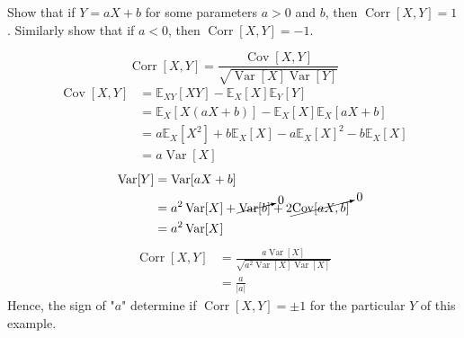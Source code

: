 \begin{example}
	Show that if $Y=aX+b$ for some parameters $a>0$ and $b$, then $\operatorname{Corr}[X,Y]=1$. Similarly show that if $a<0$, then $\operatorname{Corr}[X,Y]=-1$.
	
	\begin{equation}
		\operatorname{Corr}[X,Y] = \frac{\operatorname{Cov}[X,Y]}{\sqrt{\operatorname{Var}[X]\operatorname{Var}[Y]}}
	\end{equation}
	\begin{equation}
		\begin{split}
			\operatorname{Cov}[X,Y] & = \mathbb{E}_{XY}[XY]-\mathbb{E}_X[X]\mathbb{E}_Y[Y]\\
			&= \mathbb{E}_X[X(aX+b)]-\mathbb{E}_X[X]\mathbb{E}_X[aX+b]\\
			&= a\mathbb{E}_X[X^2]+b\mathbb{E}_X[X]-a\mathbb{E}_X[X]^2-b\mathbb{E}_X[X]\\
			&=a\operatorname{Var}[X]
		\end{split}
	\end{equation}
	\begin{equation}
		\begin{split}
			\operatorname{Var}[Y] &= \operatorname{Var}[aX+b]\\
			&= a^2\operatorname{Var}[X]+\cancelto{0}{\operatorname{Var}[b]}+2\cancelto{0}{\operatorname{Cov}[aX,b]}\\
			& = a^2\operatorname{Var}[X]
		\end{split}
	\end{equation}
	\begin{equation}
		\begin{split}
			\operatorname{Corr}[X,Y] &= \frac{a\operatorname{Var}[X]}{\sqrt{a^2\operatorname{Var}[X]\operatorname{Var}[X]}}\\
			&=\frac{a}{|a|}		
		\end{split}
	\end{equation}
	Hence, the sign of "$a$" determine if $\operatorname{Corr}[X,Y]=\pm 1$ for the particular $Y$ of this example.
\end{example}

